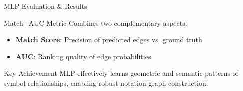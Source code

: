 \documentclass[aspectratio=169]{beamer}
\begin{document}
\begin{frame}{MLP Evaluation \& Results}
    \begin{block}{Match+AUC Metric}
        Combines two complementary aspects:
        \begin{itemize}
            \item \textbf{Match Score}: Precision of predicted edges vs. ground truth
            \item \textbf{AUC}: Ranking quality of edge probabilities
        \end{itemize}
    \end{block}
    
    \begin{center}
    \end{center}
    
    \vspace{0.5cm}
    \begin{block}{Key Achievement}
        MLP effectively learns geometric and semantic patterns of symbol relationships, enabling robust notation graph construction.
    \end{block}
\end{frame}
\end{document}
